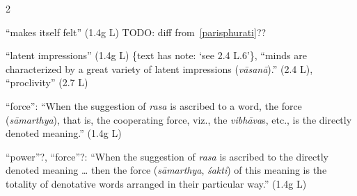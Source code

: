 \documentclass[10pt]{article}
\begin{document}
\begin{multicols}{2}
\begin{enumerate}[
			leftmargin=0em,
			rightmargin=0em,
		]
		 ``makes itself felt'' (1.4g L) TODO: diff from~\ref{parisphurati}??

		 ``latent impressions'' (1.4g L) \{text has note: `see 2.4 L.6'\},
		``minds are characterized by a great variety of latent impressions (\textit{vāsanā}).'' (2.4 L),
		``proclivity'' (2.7 L)

		 ``force'': ``When the suggestion of \textit{rasa} is ascribed to a word, the force (\textit{sāmarthya}), that is, the cooperating force, viz., the \textit{vibhāva}s, etc., is the directly denoted meaning.'' (1.4g L)

		 ``power''?, ``force''?: ``When the suggestion of \textit{rasa} is ascribed to the directly denoted meaning \dots
		then the force (\textit{sāmarthya}, \textit{śakti}) of this meaning is the totality of denotative words arranged in their particular way.'' (1.4g L)


\end{enumerate}
\end{multicols}
\end{document}
